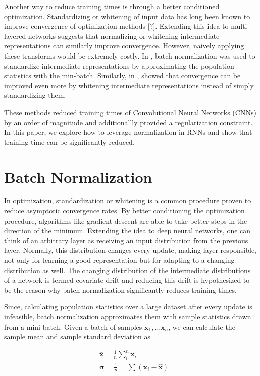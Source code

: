 \documentclass{article}
\def\x{{\mathbf x}}
\begin{document}
Another way to reduce training times is through a better conditioned optimization. Standardizing or whitening of input data has long been known to improve convergence of optimization methods [?]. Extending this idea to multi-layered networks suggests that normalizing or whitening intermediate representations can similarly improve convergence. However, naively applying these transforms would be extremely costly. In \citep{ioffe2015}, batch normalization was used to standardize intermediate representations by approximating the population statistics with the min-batch. Similarly, in \citep{desjardins2015natural}, showed that convergence can be improved even more by whitening intermediate representations instead of simply standardizing them.

These methods reduced training times of Convolutional Neural Networks (CNNs) by an order of magnitude and additionallly provided a regularization constraint. In this paper, we explore how to leverage normalization in RNNs and show that training time can be significantly reduced.

\section{Batch Normalization}

In optimization, standardization or whitening is a common procedure proven to reduce asymptotic convergence rates. By better conditioning the optimization procedure, algorithms like gradient descent are able to take better steps in the direction of the minimum. Extending the idea to deep neural networks, one can think of an arbitrary layer as receiving an input distribution from the previous layer. Normally, this distribution changes every update, making layer responsible, not only for learning a good representation but for adapting to a changing distribution as well. The changing distribution of the intermediate distributions of a network is termed covariate drift and reducing this drift is hypothesized to be the reason why batch normalization significantly reduces training times.

Since, calculating population statistics over a large dataset after every update is infeasible, batch normalization approximates them with sample statistics drawn from a mini-batch. Given a batch of samples $\x_1, \dots \x_n$, we can calculate the sample mean and sample standard deviation as

\begin{equation}
	\begin{split}
		& \bar \x = \frac{1}{n} \sum_i^n \x_i \\
		& \boldsymbol{\sigma} = \frac{1}{n} = \sum (\x_i - \hat \x)
	\end{split}
\end{equation}
\end{document}
